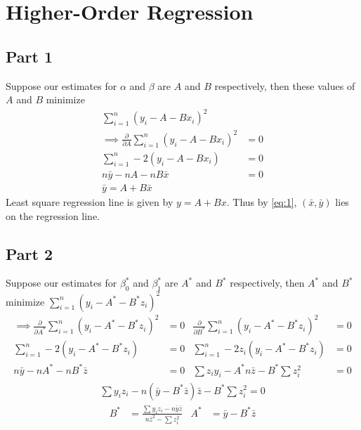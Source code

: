\section{Higher-Order Regression}

\subsection{Part 1}
Suppose our estimates for $\alpha$ and $\beta$ are $A$ and $B$ respectively,
then these values of $A$ and $B$ minimize
\begin{align}
	\sum_{i=1}^{n} (y_i - A - Bx_i)^2                                                    \\
	\implies \frac{\partial}{\partial A}\sum_{i=1}^{n} (y_i - A - Bx_i)^2 & = 0          \\
	\sum_{i=1}^{n} -2(y_i - A - Bx_i)                                     & = 0          \\
	n\bar{y} - nA - nB\bar{x}                                             & = 0          \\
	\bar{y} = A + B\bar{x}                                                & \label{eq:1}
\end{align}
Least square regression line is given by $y = A + Bx$. Thus by \eqref{eq:1},
$(\bar{x}, \bar{y})$ lies on the regression line.

\subsection{Part 2}
Suppose our estimates for $\beta_0^*$ and $\beta_1^*$ are $A^*$ and $B^*$ respectively,
then $A^*$ and $B^*$ minimize $\sum_{i=1}^{n} (y_i - A^* - B^*z_i)^2$
\begin{align}
	\implies \frac{\partial}{\partial A^*}\sum_{i=1}^{n} (y_i - A^* - B^*z_i)^2 & = 0 & \frac{\partial}{\partial B^*}\sum_{i=1}^{n} (y_i - A^* - B^*z_i)^2 & = 0 \\
	\sum_{i=1}^{n} -2(y_i - A^* - B^*z_i)                                       & = 0 & \sum_{i=1}^{n} -2z_i(y_i - A^* - B^*z_i)                           & = 0 \\
	n\bar{y} - nA^* - nB^*\bar{z}                                               & = 0 & \sum z_iy_i - A^*n\bar{z} - B^*\sum z_i^2                          & = 0
\end{align}
\begin{align}
	\sum y_iz_i - n(\bar{y} - B^*\bar{z})\bar{z} - B^*\sum z_i^2  = 0
\end{align}
\begin{align}
	B^* & = \frac{\sum y_iz_i - n\bar{y}\bar{z}}{n\bar{z}^2-\sum z_i^2} & A^* & = \bar{y} - B^*\bar{z}
\end{align}
